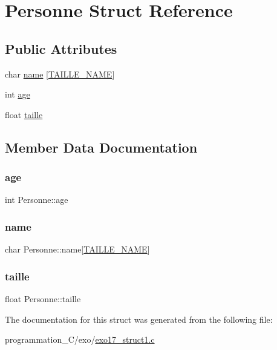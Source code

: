 \hypertarget{structPersonne}{}\section{Personne Struct Reference}
\label{structPersonne}
\subsection*{Public Attributes}
\begin{DoxyCompactItemize}
\item 
char \hyperlink{structPersonne_aba2281fa13b24a9b55030eb635083c1a}{name} \mbox{[}\hyperlink{exo17__struct1_8c_af1b1aee35b46fa33dc6494635e7b5069}{T\+A\+I\+L\+L\+E\+\_\+\+N\+A\+ME}\mbox{]}
\item 
int \hyperlink{structPersonne_a902c76ddaf0546eaba0dfb06eed087d8}{age}
\item 
float \hyperlink{structPersonne_aa3c2763986b2fcd30cb8a3bb375d8e09}{taille}
\end{DoxyCompactItemize}


\subsection{Member Data Documentation}
\mbox{\label{structPersonne_a902c76ddaf0546eaba0dfb06eed087d8}} 
\subsubsection{\texorpdfstring{age}{age}}
{\footnotesize\ttfamily int Personne\+::age}

\mbox{\label{structPersonne_aba2281fa13b24a9b55030eb635083c1a}} 
\subsubsection{\texorpdfstring{name}{name}}
{\footnotesize\ttfamily char Personne\+::name\mbox{[}\hyperlink{exo17__struct1_8c_af1b1aee35b46fa33dc6494635e7b5069}{T\+A\+I\+L\+L\+E\+\_\+\+N\+A\+ME}\mbox{]}}

\mbox{\label{structPersonne_aa3c2763986b2fcd30cb8a3bb375d8e09}} 
\subsubsection{\texorpdfstring{taille}{taille}}
{\footnotesize\ttfamily float Personne\+::taille}



The documentation for this struct was generated from the following file\+:\begin{DoxyCompactItemize}
\item 
programmation\+\_\+\+C/exo/\hyperlink{exo17__struct1_8c}{exo17\+\_\+struct1.\+c}\end{DoxyCompactItemize}
